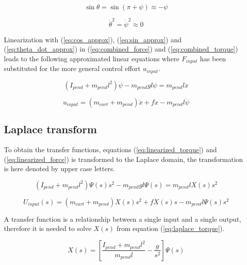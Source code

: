 \begin{appendices}
\begin{equation}
	\sin \theta = \sin(\pi + \psi) \approx -\psi \label{eq:sin_approx}
\end{equation}

\begin{equation}
	\dot{\theta}^2 = \dot{\psi}^2 \approx 0 \label{eq:theta_dot_approx}
\end{equation}

Linearization with (\ref{eq:cos_approx}), (\ref{eq:sin_approx}) and (\ref{eq:theta_dot_approx}) in (\ref{eq:combined_force}) and (\ref{eq:combined_torque}) leads to the following approximated linear equations where $F_{input}$ has been substituted for the more general control effort $u_{input}$.

\begin{equation}
	(I_{pend} + m_{pend} l^2) \ddot{\psi} - m_{pend} g l \psi = m_{pend} l \ddot{x} \label{eq:linearized_torque}
\end{equation}

\begin{equation}
	u_{input} = (m_{cart} + m_{pend}) \ddot{x} + f \dot{x} - m_{pend} l \ddot{\psi} \label{eq:linearized_force}
\end{equation}


\subsection{Laplace transform}
To obtain the transfer functions, equations (\ref{eq:linearized_torque}) and (\ref{eq:linearized_force}) is transformed to the Laplace domain, the transformation is here denoted by upper case letters.

\begin{equation}
	(I_{pend} + m_{pend} l^2) \Psi(s) s^2 - m_{pend} g l \Psi(s) = m_{pend} l X(s) s^2 \label{eq:laplace_torque}
\end{equation}

\begin{equation}
	U_{input}(s) = (m_{cart} + m_{pend}) X(s) s^2 + f X(s) s - m_{pend} l \Psi(s) s^2 \label{eq:laplace_force}
\end{equation}

A transfer function is a relationship between a single input and a single output, therefore it is needed to solve $X(s)$ from equation (\ref{eq:laplace_torque}).

\begin{equation}
	X(s) = \left[ \frac{I_{pend} + m_{pend} l^2}{m_{pend} l} - \frac{g}{s^2} \right] \Psi(s) \label{eq:X_solution}
\end{equation}


\end{appendices}
